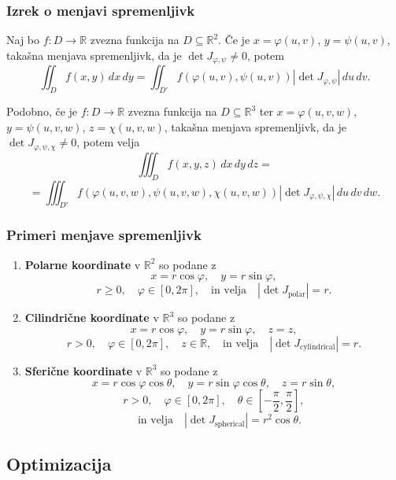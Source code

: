 \documentclass{article}
\begin{document}
\begin{multicols}{2}
\subsubsection{Izrek o menjavi spremenljivk} 
Naj bo \( f: D \rightarrow \mathbb{R} \) zvezna funkcija na \( D \subseteq \mathbb{R}^2 \). Če je \( x = \varphi(u, v) \), \( y = \psi(u, v) \), takašna menjava spremenljivk, da je \( \det J_{\varphi,\psi} \neq 0 \), potem
\[
\iint_D f(x, y) \,dx\,dy = \iint_{D'} f(\varphi(u, v), \psi(u, v)) \left| \det J_{\varphi,\psi} \right| \,du\,dv.
\]

Podobno, če je \( f: D \rightarrow \mathbb{R} \) zvezna funkcija na \( D \subseteq \mathbb{R}^3 \) ter \( x = \varphi(u, v, w) \), \( y = \psi(u, v, w) \), \( z = \chi(u, v, w) \), takašna menjava spremenljivk, da je \( \det J_{\varphi,\psi,\chi} \neq 0 \), potem velja
\[
\iiint_D f(x, y, z) \,dx\,dy\,dz = 
\]
\[
 = \iiint_{D'} f(\varphi(u, v, w), \psi(u, v, w), \chi(u, v, w)) \left| \det J_{\varphi,\psi,\chi} \right| \,du\,dv\,dw.
\]

\subsubsection{Primeri menjave spremenljivk}

\begin{enumerate}
\item \textbf{Polarne koordinate} v \( \mathbb{R}^2 \) so podane z
\[ 
x = r \cos \varphi, \quad y = r \sin \varphi, 
\]
\[ 
r \geq 0, \quad \varphi \in [0, 2\pi], \quad \text{in velja} \quad |\det J_{\text{polar}}| = r.
\]

\item \textbf{Cilindrične koordinate} v \( \mathbb{R}^3 \) so podane z
\[ 
x = r \cos \varphi, \quad y = r \sin \varphi, \quad z = z, 
\]
\[ 
r > 0, \quad \varphi \in [0, 2\pi], \quad z \in \mathbb{R}, \quad \text{in velja} \quad |\det J_{\text{cylindrical}}| = r.
\]

\item \textbf{Sferične koordinate} v \( \mathbb{R}^3 \) so podane z
\[ 
x = r \cos \varphi \cos \theta, \quad y = r \sin \varphi \cos \theta, \quad z = r \sin \theta,
\]
\[ 
r > 0, \quad \varphi \in [0, 2\pi], \quad \theta \in \left[-\frac{\pi}{2}, \frac{\pi}{2}\right], 
\]
\[
\quad \text{in velja} \quad |\det J_{\text{spherical}}| = r^2 \cos \theta.
\]
\end{enumerate}


\subsection{Optimizacija}


\end{multicols}
\end{document}
